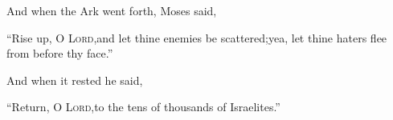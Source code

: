 \begin{inparaenum}
   And when the Ark went forth, Moses said,\smallskip%
  
  \pa ``Rise up, O \textsc{Lord},\pa and let thine enemies be scattered;\pa yea, let thine haters flee from before thy face.''%
  
  \noindent{} And when it rested he said,\smallskip%
  
  \pa ``Return, O \textsc{Lord},\pa to the tens of thousands of Israelites.''%
\end{inparaenum}
